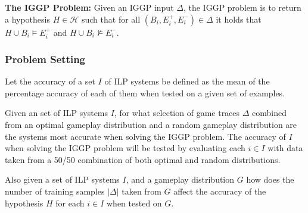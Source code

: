\textbf{The IGGP Problem:} Given an IGGP input $\Delta$, the IGGP problem is to return a hypothesis $H \in \mathscr{H}$ such that for all $(B_i,E_i^+,E_i^-) \in \Delta$ it holds that $H \cup B_i \models E_i^+$ and
$H \cup B_i \not\models E_i^-$.


\subsubsection{Problem Setting}

Let the accuracy of a set $I$ of ILP systems be defined as the mean of the percentage accuracy of each of them when tested on a given set of examples.

Given an set of ILP systems $I$, for what selection of game traces $\Delta$ combined from an optimal gameplay distribution and a random gameplay distribution are the systems most accurate when solving the IGGP problem. The accuracy of $I$ when solving the IGGP problem will be tested by evaluating each $i \in I$ with data taken from a 50/50 combination of both optimal and random distributions.

Also given a set of ILP systems $I$, and a gameplay distribution $G$ how does the number of training samples $|\Delta|$ taken from $G$ affect the accuracy of the hypothesis $H$ for each $i \in I$ when tested on $G$.

